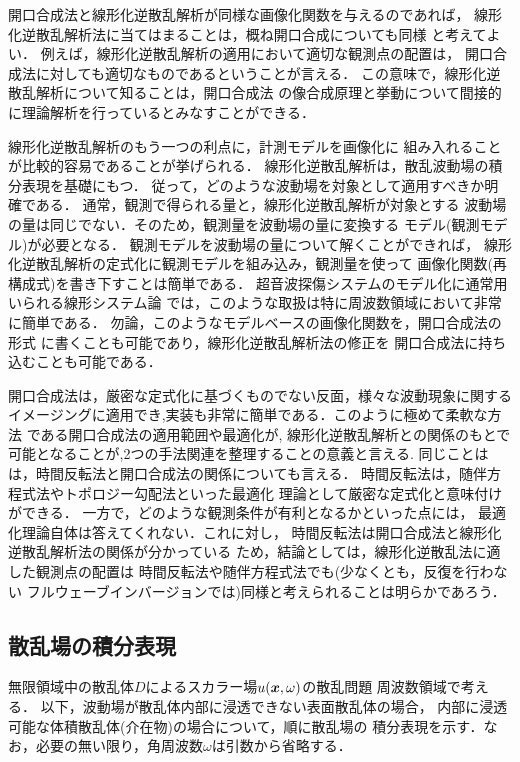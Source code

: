 開口合成法と線形化逆散乱解析が同様な画像化関数を与えるのであれば，
線形化逆散乱解析法に当てはまることは，概ね開口合成についても同様
と考えてよい．
例えば，線形化逆散乱解析の適用において適切な観測点の配置は，
開口合成法に対しても適切なものであるということが言える．
この意味で，線形化逆散乱解析について知ることは，開口合成法
の像合成原理と挙動について間接的に理論解析を行っているとみなすことができる．


線形化逆散乱解析のもう一つの利点に，計測モデルを画像化に
組み入れることが比較的容易であることが挙げられる．
線形化逆散乱解析は，散乱波動場の積分表現を基礎にもつ．
従って，どのような波動場を対象として適用すべきか明確である．
通常，観測で得られる量と，線形化逆散乱解析が対象とする
波動場の量は同じでない．そのため，観測量を波動場の量に変換する
モデル(観測モデル)が必要となる．
観測モデルを波動場の量について解くことができれば，
線形化逆散乱解析の定式化に観測モデルを組み込み，観測量を使って
画像化関数(再構成式)を書き下すことは簡単である．
超音波探傷システムのモデル化に通常用いられる線形システム論
では，このような取扱は特に周波数領域において非常に簡単である．
勿論，このようなモデルベースの画像化関数を，開口合成法の形式
に書くことも可能であり，線形化逆散乱解析法の修正を
開口合成法に持ち込むことも可能である．

開口合成法は，厳密な定式化に基づくものでない反面，様々な波動現象に関する
イメージングに適用でき,実装も非常に簡単である．このように極めて柔軟な方法
である開口合成法の適用範囲や最適化が, 線形化逆散乱解析との関係のもとで
可能となることが,2つの手法関連を整理することの意義と言える.
同じことはは，時間反転法と開口合成法の関係についても言える．
時間反転法は，随伴方程式法やトポロジー勾配法といった最適化
理論として厳密な定式化と意味付けができる．
一方で，どのような観測条件が有利となるかといった点には，
最適化理論自体は答えてくれない．これに対し，
時間反転法は開口合成法と線形化逆散乱解析法の関係が分かっている
ため，結論としては，線形化逆散乱法に適した観測点の配置は
時間反転法や随伴方程式法でも(少なくとも，反復を行わない
フルウェーブインバージョンでは)同様と考えられることは明らかであろう．
\subsection{散乱場の積分表現}
無限領域中の散乱体$D$によるスカラー場$u(\mbox{\boldmath $x$},\omega)$の散乱問題
周波数領域で考える．
以下，波動場が散乱体内部に浸透できない表面散乱体の場合，
内部に浸透可能な体積散乱体(介在物)の場合について，順に散乱場の
積分表現を示す．なお，必要の無い限り，角周波数$\omega$は引数から省略する．
